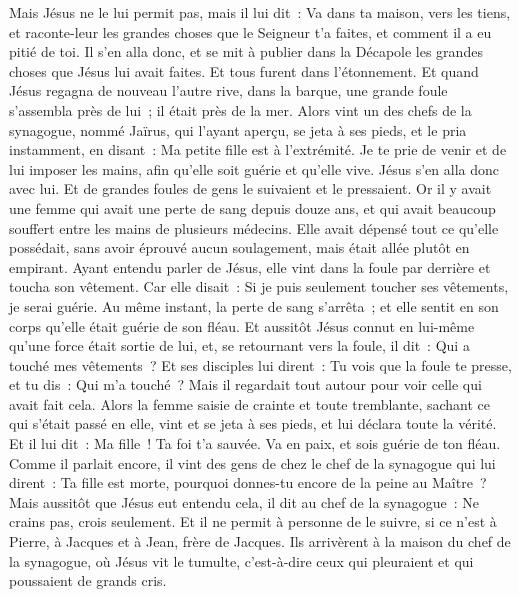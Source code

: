\begin{multicols}{2}
Mais Jésus ne le lui permit pas, mais il lui dit~: Va dans ta maison, vers les tiens, et raconte-leur les grandes choses que le Seigneur t'a faites, et comment il a eu pitié de toi.
Il s'en alla donc, et se mit à publier dans la Décapole les grandes choses que Jésus lui avait faites. Et tous furent dans l'étonnement.
Et quand Jésus regagna de nouveau l'autre rive, dans la barque, une grande foule s'assembla près de lui~; il était près de la mer.
Alors vint un des chefs de la synagogue, nommé Jaïrus, qui l'ayant aperçu, se jeta à ses pieds,
et le pria instamment, en disant~: Ma petite fille est à l'extrémité. Je te prie de venir et de lui imposer les mains, afin qu'elle soit guérie et qu'elle vive.
Jésus s'en alla donc avec lui. Et de grandes foules de gens le suivaient et le pressaient.
Or il y avait une femme qui avait une perte de sang depuis douze ans,
et qui avait beaucoup souffert entre les mains de plusieurs médecins. Elle avait dépensé tout ce qu'elle possédait, sans avoir éprouvé aucun soulagement, mais était allée plutôt en empirant.
Ayant entendu parler de Jésus, elle vint dans la foule par derrière et toucha son vêtement.
Car elle disait~: Si je puis seulement toucher ses vêtements, je serai guérie.
Au même instant, la perte de sang s'arrêta~; et elle sentit en son corps qu'elle était guérie de son fléau.
Et aussitôt Jésus connut en lui-même qu'une force était sortie de lui, et, se retournant vers la foule, il dit~: Qui a touché mes vêtements~?
Et ses disciples lui dirent~: Tu vois que la foule te presse, et tu dis~: Qui m'a touché~?
Mais il regardait tout autour pour voir celle qui avait fait cela.
Alors la femme saisie de crainte et toute tremblante, sachant ce qui s'était passé en elle, vint et se jeta à ses pieds, et lui déclara toute la vérité.
Et il lui dit~: Ma fille~! Ta foi t'a sauvée. Va en paix, et sois guérie de ton fléau.
Comme il parlait encore, il vint des gens de chez le chef de la synagogue qui lui dirent~: Ta fille est morte, pourquoi donnes-tu encore de la peine au Maître~?
Mais aussitôt que Jésus eut entendu cela, il dit au chef de la synagogue~: Ne crains pas, crois seulement.
Et il ne permit à personne de le suivre, si ce n'est à Pierre, à Jacques et à Jean, frère de Jacques.
Ils arrivèrent à la maison du chef de la synagogue, où Jésus vit le tumulte, c'est-à-dire ceux qui pleuraient et qui poussaient de grands cris.

\end{multicols}
